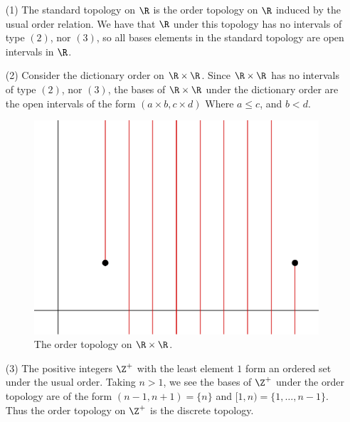 \begin{example}
    \begin{enumerate}
        \item[(1)] The standard topology on $\R$ is the order topology on $\R$ induced by the
            usual order relation. We have that $\R$ under this topology has no intervals of
            type  $(2)$, nor  $(3)$, so all bases elements in the standard topology are
            open intervals in $\R$.

        \item[(2)] Consider the dictionary order on  $\R \times \R$. Since  $\R \times \R$ has
            no intervals of type $(2)$, nor $(3)$, the bases of  $\R \times \R$ under the
            dictionary order are the open intervals of the form  $(a \times b, c \times d)$ Where
             $a \leq c$, and  $b<d$.

             \begin{figure}[h]
                 \centering
                 \includegraphics[scale = 0.5]{Figures/Chapter1/order_topology.eps}
                 \caption{The order topology on $\R \times \R$.}
                 \label{fig1.3}
             \end{figure}

         \item[(3)] The positive integers  $\Z^+$ with the least element  $1$ form an ordered set
             under the usual order. Taking  $n>1$, we see the bases of  $\Z^+$ under the order
             topology are of the form  $(n-1,n+1)=\{n\}$ and $[1,n)=\{1, \dots ,n-1\}$. Thus
             the order topology on  $\Z^+$ is the discrete topology.



\end{enumerate}
\end{example}
